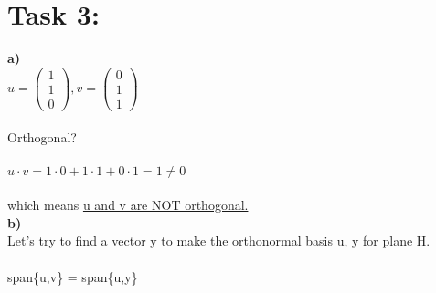 \documentclass[11pt]{amsart}
\begin{document}
 
\section{Task 3:}
 
\textbf{a)}\\

$u = \begin{pmatrix} 1\\1\\0 \end{pmatrix}, v = \begin{pmatrix} 0\\1\\1 \end{pmatrix}$ \\\\Orthogonal?\\\\  $u \cdot v = 1\cdot0 + 1\cdot1 + 0\cdot1 = 1 \neq 0$
\\\\which means \underline{u and v are NOT orthogonal.}\\

\textbf{b)}\\

Let's try to find a vector y to make the orthonormal basis u, y for plane H.\\\\
span\{u,v\} = span\{u,y\} \\
\end{document}

